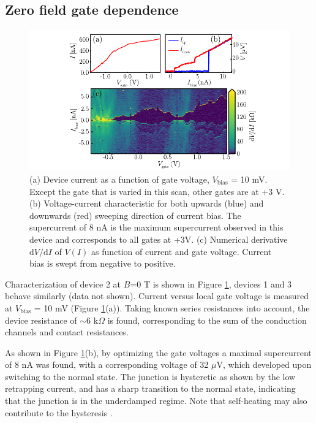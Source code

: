 \subsection{Zero field gate dependence}

\begin{figure}[!h]
\centering
\includegraphics[width=\textwidth]{chapter_supercurrent/figures/sup_fig1.pdf}
\caption{(a) Device current as a function of gate voltage, $V_\mathrm{bias}$ = 10 mV. Except the gate that is varied in this scan, other gates are at +3 V. (b) Voltage-current characteristic for both upwards (blue) and downwards (red) sweeping direction of current bias. The supercurrent of 8 nA is the maximum supercurrent observed in this device and corresponds to all gates at +3V. (c) Numerical derivative $\mathrm{d}V/\mathrm{d}I$ of $V\left(I\right)$ as function of current and gate voltage. Current bias is swept from negative to positive.}
\label{fig: charaterization_D1}
\end{figure}

Characterization of device 2 at $B$=0 T is shown in Figure \ref{fig: charaterization_D1}, devices 1 and 3 behave similarly (data not shown).
Current versus local gate voltage is measured at $V_{\text{bias}}$ = 10 mV (Figure \ref{fig: charaterization_D1}(a)). 
Taking known series resistances into account, the device resistance of $\sim$6 k$\Omega$ is found, corresponding to the sum of the conduction channels and contact resistances.

As shown in Figure \ref{fig: charaterization_D1}(b), by optimizing the gate voltages a maximal supercurrent of 8 nA was found, with a corresponding voltage of 32 $\mu$V, which developed upon switching to the normal state. 
The junction is hysteretic as shown by the low retrapping current, and has a sharp transition to the normal state, indicating that the junction is in the underdamped regime. 
Note that self-heating may also contribute to the hysteresis \cite{Courtois2008}. 

